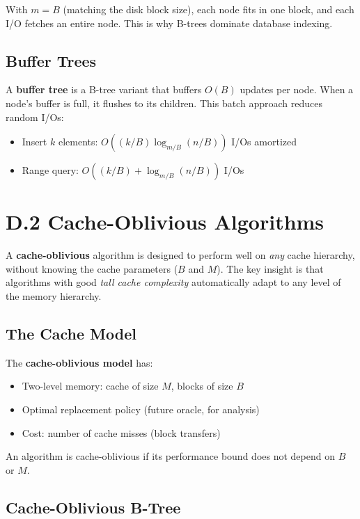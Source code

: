 With $m = B$ (matching the disk block size), each node fits in one block, and each I/O fetches an entire node. This is why B-trees dominate database indexing.

\subsection{Buffer Trees}

A \textbf{buffer tree} is a B-tree variant that buffers $O(B)$ updates per node. When a node's buffer is full, it flushes to its children. This batch approach reduces random I/Os:
\begin{itemize}
    \item Insert $k$ elements: $O((k/B) \log_{m/B} (n/B))$ I/Os amortized
    \item Range query: $O((k/B) + \log_{m/B} (n/B))$ I/Os
\end{itemize}

\section{D.2 Cache-Oblivious Algorithms}
\label{sec:cache-oblivious}

A \textbf{cache-oblivious} algorithm is designed to perform well on \emph{any} cache hierarchy, without knowing the cache parameters ($B$ and $M$). The key insight is that algorithms with good \emph{tall cache complexity} automatically adapt to any level of the memory hierarchy.

\subsection{The Cache Model}

The \textbf{cache-oblivious model} has:
\begin{itemize}
    \item Two-level memory: cache of size $M$, blocks of size $B$
    \item Optimal replacement policy (future oracle, for analysis)
    \item Cost: number of cache misses (block transfers)
\end{itemize}

An algorithm is cache-oblivious if its performance bound does not depend on $B$ or $M$.

\subsection{Cache-Oblivious B-Tree}

